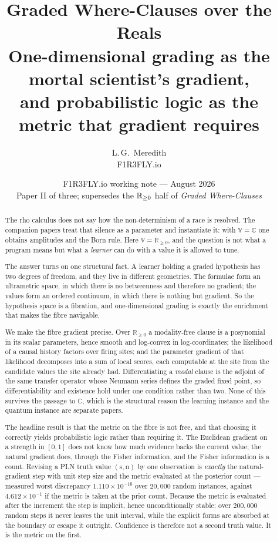 \documentclass[11pt,a4paper]{article}
\title{\bfseries Graded Where-Clauses over the Reals\\[4pt]
\large One-dimensional grading as the mortal scientist's gradient,\\
and probabilistic logic as the metric that gradient requires}
\author{L.\,G.\ Meredith\\ \small F1R3FLY.io}
\date{F1R3FLY.io working note --- August 2026\\[2pt]
\normalsize Paper II of three; supersedes the $\Rnn$ half of
\emph{Graded Where-Clauses}}
\theoremstyle{plain}
\theoremstyle{definition}
\theoremstyle{remark}
\newcommand{\V}{\mathbb{V}}
\newcommand{\Rnn}{\mathbb{R}_{\geq 0}}
\newcommand{\Cx}{\mathbb{C}}
\newcommand{\str}{\mathrm{s}}
\newcommand{\ev}{\mathrm{n}}
\begin{document}
\maketitle

\begin{abstract}
The rho calculus does not say how the non-determinism of a race is resolved.
The companion papers treat that silence as a parameter and instantiate it: with
$\V = \Cx$ one obtains amplitudes and the Born rule. Here $\V = \Rnn$, and the
question is not what a program means but what a \emph{learner} can do with a
value it is allowed to tune.

The answer turns on one structural fact. A learner holding a graded hypothesis
has two degrees of freedom, and they live in different geometries. The formulae
form an ultrametric space, in which there is no betweenness and therefore no
gradient; the values form an ordered continuum, in which there is nothing but
gradient. So the hypothesis space is a fibration, and one-dimensional grading is
exactly the enrichment that makes the fibre navigable.

We make the fibre gradient precise. Over $\Rnn$ a modality-free clause is a
posynomial in its scalar parameters, hence smooth and log-convex in
log-coordinates; the likelihood of a causal history factors over firing sites;
and the parameter gradient of that likelihood decomposes into a sum of local
scores, each computable at the site from the candidate values the site already
had. Differentiating a \emph{modal} clause is the adjoint of the same transfer
operator whose Neumann series defines the graded fixed point, so
differentiability and existence hold under one condition rather than two. None
of this survives the passage to $\Cx$, which is the structural reason the
learning instance and the quantum instance are separate papers.

The headline result is that the metric on the fibre is not free, and that
choosing it correctly yields probabilistic logic rather than requiring it. The
Euclidean gradient on a strength in $[0,1]$ does not know how much evidence
backs the current value; the natural gradient does, through the Fisher
information, and the Fisher information is a count. Revising a PLN truth value
$(\str,\ev)$ by one observation is \emph{exactly} the natural-gradient step with
unit step size and the metric evaluated at the posterior count --- measured worst
discrepancy $1.110\times10^{-16}$ over $20{,}000$ random instances, against
$4.612\times10^{-1}$ if the metric is taken at the prior count. Because the
metric is evaluated after the increment the step is implicit, hence
unconditionally stable: over $200{,}000$ random steps it never leaves the unit
interval, while the explicit forms are absorbed at the boundary or escape it
outright. Confidence is therefore not a second truth value. It is the metric on
the first.


\end{abstract}
\end{document}
